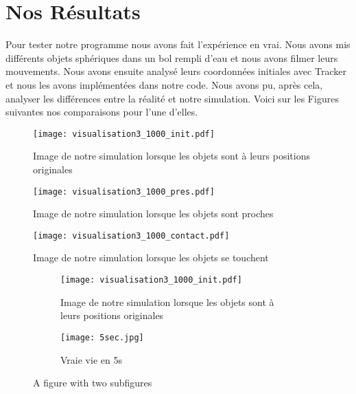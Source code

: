 \section{Nos Résultats}
    Pour tester notre programme nous avons fait l'expérience en vrai. Nous avons mis différents objets sphériques dans un bol rempli d'eau et nous avons filmer leurs mouvements. Nous avons ensuite analysé leurs coordonnées initiales avec Tracker et nous les avons implémentées dans notre code. Nous avons pu, après cela, analyser les différences entre la réalité et notre simulation. Voici sur les Figures suivantes nos comparaisons pour l'une d'elles.

    \begin{figure}[H]
        \centering
        \texttt{[image: visualisation3\_1000\_init.pdf]}
        \caption{Image de notre simulation lorsque les objets sont à leurs positions originales}
        \label{fig:simul_init}
    \end{figure}
    \begin{figure}[H]
        \centering
        \texttt{[image: visualisation3\_1000\_pres.pdf]}
        \caption{Image de notre simulation lorsque les objets sont proches}
        \label{fig:simul_pres}
    \end{figure}
    \begin{figure}[H]
        \centering
        \texttt{[image: visualisation3\_1000\_contact.pdf]}
        \caption{Image de notre simulation lorsque les objets se touchent}
        \label{fig:simul_contact}
    \end{figure}

    \begin{figure}
        \centering
        \begin{subfigure}{0.5\textwidth}
            \centering
            \texttt{[image: visualisation3\_1000\_init.pdf]}
            \caption{Image de notre simulation lorsque les objets sont à leurs positions originales}
        \end{subfigure}%
        \begin{subfigure}{.5\textwidth}
            \centering
            \texttt{[image: 5sec.jpg]}
            \caption{Vraie vie en 5s}
        \end{subfigure}
        \caption{A figure with two subfigures}
    \end{figure}
    
